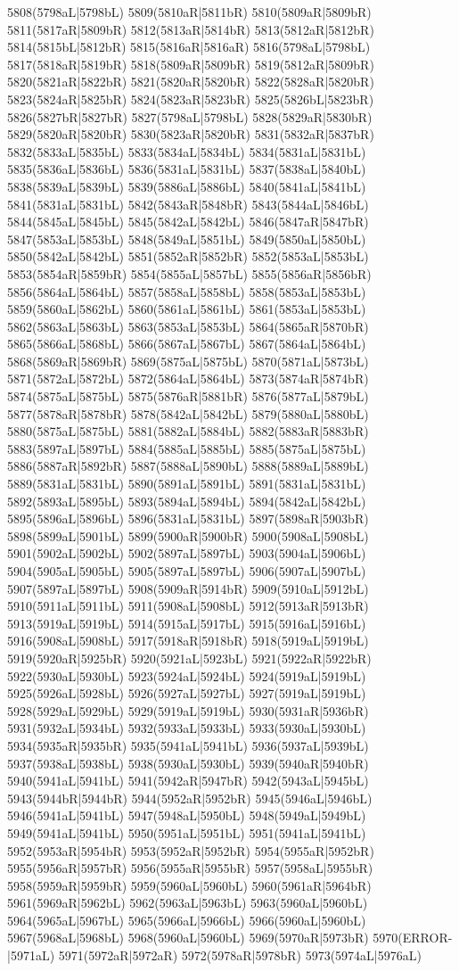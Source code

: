 5808(5798aL|5798bL) 5809(5810aR|5811bR) 5810(5809aR|5809bR) 5811(5817aR|5809bR) 5812(5813aR|5814bR) 5813(5812aR|5812bR) 5814(5815bL|5812bR) 5815(5816aR|5816aR) 5816(5798aL|5798bL) 5817(5818aR|5819bR) 5818(5809aR|5809bR) 5819(5812aR|5809bR) 5820(5821aR|5822bR) 5821(5820aR|5820bR) 5822(5828aR|5820bR) 5823(5824aR|5825bR) 5824(5823aR|5823bR) 5825(5826bL|5823bR) 5826(5827bR|5827bR) 5827(5798aL|5798bL) 5828(5829aR|5830bR) 5829(5820aR|5820bR) 5830(5823aR|5820bR) 5831(5832aR|5837bR) 5832(5833aL|5835bL) 5833(5834aL|5834bL) 5834(5831aL|5831bL) 5835(5836aL|5836bL) 5836(5831aL|5831bL) 5837(5838aL|5840bL) 5838(5839aL|5839bL) 5839(5886aL|5886bL) 5840(5841aL|5841bL) 5841(5831aL|5831bL) 5842(5843aR|5848bR) 5843(5844aL|5846bL) 5844(5845aL|5845bL) 5845(5842aL|5842bL) 5846(5847aR|5847bR) 5847(5853aL|5853bL) 5848(5849aL|5851bL) 5849(5850aL|5850bL) 5850(5842aL|5842bL) 5851(5852aR|5852bR) 5852(5853aL|5853bL) 5853(5854aR|5859bR) 5854(5855aL|5857bL) 5855(5856aR|5856bR) 5856(5864aL|5864bL) 5857(5858aL|5858bL) 5858(5853aL|5853bL) 5859(5860aL|5862bL) 5860(5861aL|5861bL) 5861(5853aL|5853bL) 5862(5863aL|5863bL) 5863(5853aL|5853bL) 5864(5865aR|5870bR) 5865(5866aL|5868bL) 5866(5867aL|5867bL) 5867(5864aL|5864bL) 5868(5869aR|5869bR) 5869(5875aL|5875bL) 5870(5871aL|5873bL) 5871(5872aL|5872bL) 5872(5864aL|5864bL) 5873(5874aR|5874bR) 5874(5875aL|5875bL) 5875(5876aR|5881bR) 5876(5877aL|5879bL) 5877(5878aR|5878bR) 5878(5842aL|5842bL) 5879(5880aL|5880bL) 5880(5875aL|5875bL) 5881(5882aL|5884bL) 5882(5883aR|5883bR) 5883(5897aL|5897bL) 5884(5885aL|5885bL) 5885(5875aL|5875bL) 5886(5887aR|5892bR) 5887(5888aL|5890bL) 5888(5889aL|5889bL) 5889(5831aL|5831bL) 5890(5891aL|5891bL) 5891(5831aL|5831bL) 5892(5893aL|5895bL) 5893(5894aL|5894bL) 5894(5842aL|5842bL) 5895(5896aL|5896bL) 5896(5831aL|5831bL) 5897(5898aR|5903bR) 5898(5899aL|5901bL) 5899(5900aR|5900bR) 5900(5908aL|5908bL) 5901(5902aL|5902bL) 5902(5897aL|5897bL) 5903(5904aL|5906bL) 5904(5905aL|5905bL) 5905(5897aL|5897bL) 5906(5907aL|5907bL) 5907(5897aL|5897bL) 5908(5909aR|5914bR) 5909(5910aL|5912bL) 5910(5911aL|5911bL) 5911(5908aL|5908bL) 5912(5913aR|5913bR) 5913(5919aL|5919bL) 5914(5915aL|5917bL) 5915(5916aL|5916bL) 5916(5908aL|5908bL) 5917(5918aR|5918bR) 5918(5919aL|5919bL) 5919(5920aR|5925bR) 5920(5921aL|5923bL) 5921(5922aR|5922bR) 5922(5930aL|5930bL) 5923(5924aL|5924bL) 5924(5919aL|5919bL) 5925(5926aL|5928bL) 5926(5927aL|5927bL) 5927(5919aL|5919bL) 5928(5929aL|5929bL) 5929(5919aL|5919bL) 5930(5931aR|5936bR) 5931(5932aL|5934bL) 5932(5933aL|5933bL) 5933(5930aL|5930bL) 5934(5935aR|5935bR) 5935(5941aL|5941bL) 5936(5937aL|5939bL) 5937(5938aL|5938bL) 5938(5930aL|5930bL) 5939(5940aR|5940bR) 5940(5941aL|5941bL) 5941(5942aR|5947bR) 5942(5943aL|5945bL) 5943(5944bR|5944bR) 5944(5952aR|5952bR) 5945(5946aL|5946bL) 5946(5941aL|5941bL) 5947(5948aL|5950bL) 5948(5949aL|5949bL) 5949(5941aL|5941bL) 5950(5951aL|5951bL) 5951(5941aL|5941bL) 5952(5953aR|5954bR) 5953(5952aR|5952bR) 5954(5955aR|5952bR) 5955(5956aR|5957bR) 5956(5955aR|5955bR) 5957(5958aL|5955bR) 5958(5959aR|5959bR) 5959(5960aL|5960bL) 5960(5961aR|5964bR) 5961(5969aR|5962bL) 5962(5963aL|5963bL) 5963(5960aL|5960bL) 5964(5965aL|5967bL) 5965(5966aL|5966bL) 5966(5960aL|5960bL) 5967(5968aL|5968bL) 5968(5960aL|5960bL) 5969(5970aR|5973bR) 5970(ERROR-|5971aL) 5971(5972aR|5972aR) 5972(5978aR|5978bR) 5973(5974aL|5976aL) 